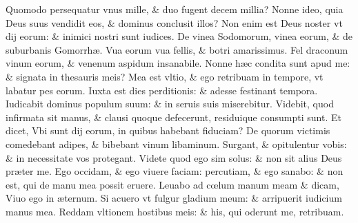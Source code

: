 \documentclass[a5paper,10pt]{book}
\def\ae{æ}
\def\oe{œ}
\begin{document}
\begin{multicols*}{2}
\newline \color{red} Q\color{black}uomodo persequatur vnus mille, \& duo fugent decem millia?
\newline \color{red} N\color{black}onne ideo, quia Deus suus vendidit eos, \& dominus conclusit illos?
\newline \color{red} N\color{black}on enim est Deus noster vt dij eorum: \& inimici nostri sunt iudices.
\newline \color{red} D\color{black}e vinea Sodomorum, vinea eorum, \& de suburbanis Gomorrh\ae .
\newline \color{red} V\color{black}ua eorum vua fellis, \& botri amarissimus.%
\newline \color{red} F\color{black}el draconum vinum eorum, \& venenum aspidum insanabile.
\newline \color{red} N\color{black}onne h\ae c condita sunt apud me: \& signata in thesauris meis?
\newline \color{red} M\color{black}ea est vltio, \& ego retribuam in tempore, vt labatur pes eorum.
\newline \color{red} I\color{black}uxta est dies perditionis: \& adesse festinant tempora.
\newline \color{red} I\color{black}udicabit dominus populum suum: \& in seruis suis miserebitur.
\newline \color{red} V\color{black}idebit, quod infirmata sit manus, \& clausi quoque defecerunt, residuique consumpti sunt.
\newline \color{red} E\color{black}t dicet, Vbi sunt dij eorum, in quibus habebant fiduciam?
\newline \color{red} D\color{black}e quorum victimis comedebant adipes, \& bibebant vinum libaminum.
\newline \color{red} S\color{black}urgant, \& opitulentur vobis: \& in necessitate vos protegant.
\newline \color{red} V\color{black}idete quod ego sim solus: \& non sit alius Deus pr\ae ter me.
\newline \color{red} E\color{black}go occidam, \& ego viuere faciam: percutiam, \& ego sanabo: \& non est, qui de manu mea possit eruere.
\newline \color{red} L\color{black}euabo ad c\oe lum manum meam \& dicam, Viuo ego in \ae ternum.
\newline \color{red} S\color{black}i acuero vt fulgur gladium meum: \& arripuerit iudicium manus mea.
\newline \color{red} R\color{black}eddam vltionem hostibus meis: \& his, qui oderunt me, retribuam.

\end{multicols*}
\end{document}
